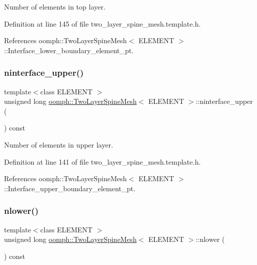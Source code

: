Number of elements in top layer. 



Definition at line 145 of file two\+\_\+layer\+\_\+spine\+\_\+mesh.\+template.\+h.



References oomph\+::\+Two\+Layer\+Spine\+Mesh$<$ E\+L\+E\+M\+E\+N\+T $>$\+::\+Interface\+\_\+lower\+\_\+boundary\+\_\+element\+\_\+pt.

\mbox{\label{classoomph_1_1TwoLayerSpineMesh_adb5035599cf78ba65e53f7183c98e115}} 
\subsubsection{\texorpdfstring{ninterface\+\_\+upper()}{ninterface\_upper()}}
{\footnotesize\ttfamily template$<$class E\+L\+E\+M\+E\+NT $>$ \\
unsigned long \hyperlink{classoomph_1_1TwoLayerSpineMesh}{oomph\+::\+Two\+Layer\+Spine\+Mesh}$<$ E\+L\+E\+M\+E\+NT $>$\+::ninterface\+\_\+upper (\begin{DoxyParamCaption}{ }\end{DoxyParamCaption}) const\hspace{0.3cm}{\ttfamily [inline]}}



Number of elements in upper layer. 



Definition at line 141 of file two\+\_\+layer\+\_\+spine\+\_\+mesh.\+template.\+h.



References oomph\+::\+Two\+Layer\+Spine\+Mesh$<$ E\+L\+E\+M\+E\+N\+T $>$\+::\+Interface\+\_\+upper\+\_\+boundary\+\_\+element\+\_\+pt.

\mbox{\label{classoomph_1_1TwoLayerSpineMesh_acc617bc2ae9ee4c5084c8fb004a0b1a4}} 
\subsubsection{\texorpdfstring{nlower()}{nlower()}}
{\footnotesize\ttfamily template$<$class E\+L\+E\+M\+E\+NT $>$ \\
unsigned long \hyperlink{classoomph_1_1TwoLayerSpineMesh}{oomph\+::\+Two\+Layer\+Spine\+Mesh}$<$ E\+L\+E\+M\+E\+NT $>$\+::nlower (\begin{DoxyParamCaption}{ }\end{DoxyParamCaption}) const\hspace{0.3cm}{\ttfamily [inline]}}




